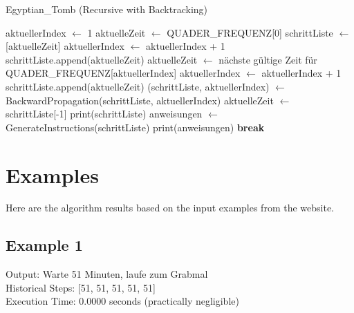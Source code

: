 \documentclass[a4paper,10pt,english]{scrartcl}
\begin{document}
\begin{algorithm}
\caption{Egyptian\_Tomb (Recursive with Backtracking)}
\begin{algorithmic}[1]
    \State aktuellerIndex $\leftarrow$ 1
    \State aktuelleZeit $\leftarrow$ QUADER\_FREQUENZ[0]
    \State schrittListe $\leftarrow$ [aktuelleZeit]
            \State aktuellerIndex $\leftarrow$ aktuellerIndex + 1
            \State schrittListe.append(aktuelleZeit)
            \State aktuelleZeit $\leftarrow$ nächste gültige Zeit für QUADER\_FREQUENZ[aktuellerIndex]
            \State aktuellerIndex $\leftarrow$ aktuellerIndex + 1
            \State schrittListe.append(aktuelleZeit)
        \Else
            \State (schrittListe, aktuellerIndex) $\leftarrow$ BackwardPropagation(schrittListe, aktuellerIndex)
            \State aktuelleZeit $\leftarrow$ schrittListe[-1]
        \EndIf
            \State print(schrittListe)
            \State anweisungen $\leftarrow$ GenerateInstructions(schrittListe)
            \State print(anweisungen)
            \State \textbf{break}
        \EndIf
    \EndWhile
\EndProcedure
\end{algorithmic}
\end{algorithm}

\section{Examples}
Here are the algorithm results based on the input examples from the website.

\subsection*{Example 1}
Output: Warte 51 Minuten, laufe zum Grabmal\\
Historical Steps: [51, 51, 51, 51, 51]\\
Execution Time: 0.0000 seconds (practically negligible)
\end{document}
